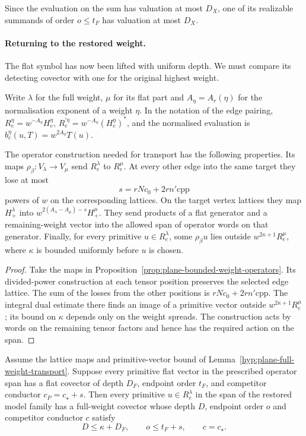 

Since the evaluation on the sum has valuation at most \(D_X\),
one of its realizable summands of order \(o\le t_F\) has
valuation at most \(D_X\).

\paragraph{Returning to the restored weight.}

The flat symbol has now been lifted with uniform depth. We must compare its detecting covector with one for the original highest weight.

Write \(\lambda\) for the full weight, \(\mu\) for its
flat part and \(A_\eta=A_r(\eta)\) for the normalisation
exponent of a weight \(\eta\). In the notation of the
edge pairing, \(R^\eta_e=w^{-A_\eta}H^\eta_e\),
\(R^{\prime\eta}_e=w^{-A_\eta}(H^\eta_e)^*\), and the
normalised evaluation is \(b^\eta_e(u,T)=w^{2A_\eta}T(u)\).
\begin{established}\label{hyp:plane-full-weight-transport}
The operator construction needed for transport has the
following properties. Its maps \(\rho_\beta:V_\lambda\to
V_\mu\) send \(R^\lambda_e\) to \(R^\mu_e\). At every
other edge into the same target they lose at most
\[
 s=rNc_0+2rn'\mathrm{cpp}
\]
powers of \(w\) on the corresponding lattices. On the
target vertex lattices they map \(H^\lambda_+\) into
\(w^{2(A_\lambda-A_\mu)-s}H^\mu_+\). They send products
of a flat generator and a remaining-weight vector into
the allowed span of operator words on that generator.
Finally, for every primitive \(u\in R^\lambda_e\), some
\(\rho_\beta u\) lies outside \(w^{2\kappa+1}R^\mu_e\),
where \(\kappa\) is bounded uniformly before \(u\) is chosen.
\end{established}
\begin{proof}
Take the maps in Proposition~\ref{prop:plane-bounded-weight-operators}. Its divided-power construction at each tensor position preserves the selected edge lattice. The sum of the losses from the other positions is \(rNc_0+2rn'\mathrm{cpp}\). The integral dual estimate there finds an image of a primitive vector outside \(w^{2\kappa+1}R_e^\mu\); its bound on \(\kappa\) depends only on the weight spreads. The construction acts by words on the remaining tensor factors and hence has the required action on the span.
\end{proof}

\begin{proposition}\label{prop:plane-restore-covector}
Assume the lattice maps and primitive-vector bound of
Lemma~\ref{hyp:plane-full-weight-transport}. Suppose every
primitive flat vector in the prescribed operator span has a
flat covector of depth \(D_F\), endpoint order \(t_F\), and
competitor conductor \(c_P=c_\star+s\). Then every primitive
\(u\in R^\lambda_e\) in the span of the restored model family
has a full-weight covector whose depth \(D\), endpoint order \(o\) and competitor conductor \(c\) satisfy
\[
 D\le\kappa+D_F,\qquad o\le t_F+s,\qquad c=c_\star.
\]

\end{proposition}

